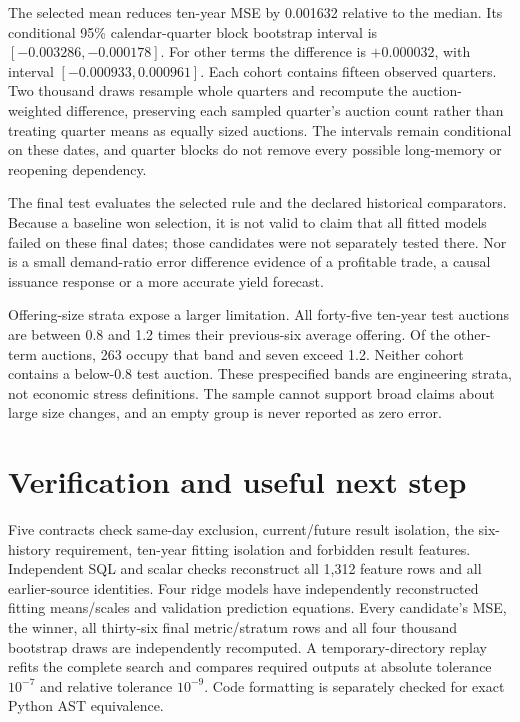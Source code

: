 \documentclass[11pt]{article}
\begin{document}
The selected mean reduces ten-year MSE by 0.001632 relative to the median. Its conditional 95\% calendar-quarter block bootstrap interval is $[-0.003286,-0.000178]$. For other terms the difference is $+0.000032$, with interval $[-0.000933,0.000961]$. Each cohort contains fifteen observed quarters. Two thousand draws resample whole quarters and recompute the auction-weighted difference, preserving each sampled quarter's auction count rather than treating quarter means as equally sized auctions. The intervals remain conditional on these dates, and quarter blocks do not remove every possible long-memory or reopening dependency.

The final test evaluates the selected rule and the declared historical comparators. Because a baseline won selection, it is not valid to claim that all fitted models failed on these final dates; those candidates were not separately tested there. Nor is a small demand-ratio error difference evidence of a profitable trade, a causal issuance response or a more accurate yield forecast.

Offering-size strata expose a larger limitation. All forty-five ten-year test auctions are between 0.8 and 1.2 times their previous-six average offering. Of the other-term auctions, 263 occupy that band and seven exceed 1.2. Neither cohort contains a below-0.8 test auction. These prespecified bands are engineering strata, not economic stress definitions. The sample cannot support broad claims about large size changes, and an empty group is never reported as zero error.
\section{Verification and useful next step}
Five contracts check same-day exclusion, current/future result isolation, the six-history requirement, ten-year fitting isolation and forbidden result features. Independent SQL and scalar checks reconstruct all 1,312 feature rows and all earlier-source identities. Four ridge models have independently reconstructed fitting means/scales and validation prediction equations. Every candidate's MSE, the winner, all thirty-six final metric/stratum rows and all four thousand bootstrap draws are independently recomputed. A temporary-directory replay refits the complete search and compares required outputs at absolute tolerance $10^{-7}$ and relative tolerance $10^{-9}$. Code formatting is separately checked for exact Python AST equivalence.
\end{document}
